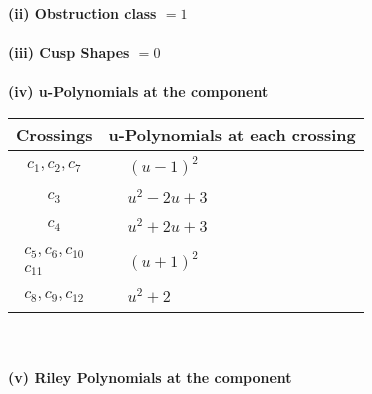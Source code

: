 \documentclass[1p]{elsarticle_modified}
\theoremstyle{definition}
\begin{document}
\flushleft \textbf{(ii) Obstruction class $= 1$}\\~\\
\flushleft \textbf{(iii) Cusp Shapes $= 0$}\\~\\
\newpage\renewcommand{\arraystretch}{1}
\flushleft \textbf{(iv) u-Polynomials at the component}\newline \\
\begin{tabular}{m{50pt}|m{274pt}}
Crossings & \hspace{64pt}u-Polynomials at each crossing \\
\hline $$\begin{aligned}c_{1},c_{2},c_{7}\end{aligned}$$&$\begin{aligned}
&(u-1)^2
\end{aligned}$\\
\hline $$\begin{aligned}c_{3}\end{aligned}$$&$\begin{aligned}
&u^2-2 u+3
\end{aligned}$\\
\hline $$\begin{aligned}c_{4}\end{aligned}$$&$\begin{aligned}
&u^2+2 u+3
\end{aligned}$\\
\hline $$\begin{aligned}c_{5},c_{6},c_{10}\\c_{11}\end{aligned}$$&$\begin{aligned}
&(u+1)^2
\end{aligned}$\\
\hline $$\begin{aligned}c_{8},c_{9},c_{12}\end{aligned}$$&$\begin{aligned}
&u^2+2
\end{aligned}$\\
\hline
\end{tabular}\\~\\
\newpage\renewcommand{\arraystretch}{1}
\flushleft \textbf{(v) Riley Polynomials at the component}\newline \\
\end{document}
